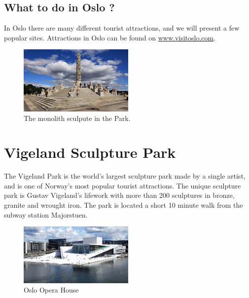 \documentclass{article}
\begin{document}
\clearpage
\begin{center}

\section*{What to do in Oslo ?}
In Oslo there are many different tourist attractions, and we will present a few  popular
sites. Attractions in Oslo can be found on \href{www.visitoslo.com}{www.visitoslo.com}.

\end{center}
\begin{figure}
    \centering
    \captionsetup{width=0.4\textwidth}
    \includegraphics[width=0.5\textwidth]{img/Vigelansparken.jpg}%
     \caption{The monolith sculpute in the Park.}
\end{figure}

\section*{Vigeland Sculpture Park}

The Vigeland Park is the world's largest sculpture park made by a single artist, and is
one of Norway's most popular tourist attractions. The unique sculpture park is Gustav
Vigeland's lifework with more than 200 sculptures in bronze, granite and wrought iron.
The park is located a short 10 minute walk from the subway station Majorstuen.

\begin{figure}
    \centering
    \includegraphics[width=0.5\textwidth]{img/operahouse.jpg}%
     \caption{Oslo Opera House }
\end{figure}
\end{document}

